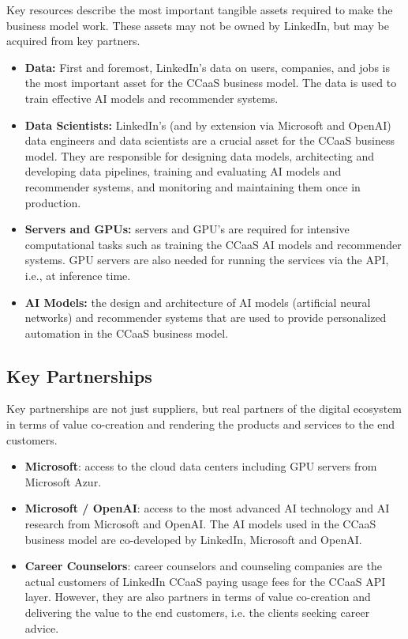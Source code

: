 Key resources describe the most important tangible assets required to make the business model work. These
assets may not be owned by LinkedIn, but may be acquired from key partners.

\begin{itemize}
        \item \textbf{Data:} First and foremost, LinkedIn's data on users, companies, and jobs is the most
                important asset for the CCaaS business model. The data is used to train effective AI models
                and recommender systems.
        \item \textbf{Data Scientists:} LinkedIn's (and by extension via Microsoft and OpenAI) data engineers 
                and data scientists are a crucial asset for the CCaaS business model. They are responsible for
                designing data models, architecting and developing data pipelines, training and evaluating
                AI models and recommender systems, and monitoring and maintaining them once in production.
        \item \textbf{Servers and GPUs:} servers and GPU's are required for intensive computational tasks 
                such as training the CCaaS AI models and recommender systems. GPU servers are also needed 
                for running the services via the API, i.e., at inference time.
        \item \textbf{AI Models:} the design and architecture of AI models (artificial neural networks) and
                recommender systems that are used to provide personalized automation in the CCaaS business model.
\end{itemize}

\subsection{Key Partnerships}

Key partnerships are not just suppliers, but real partners of the digital ecosystem in terms of value
co-creation and rendering the products and services to the end customers.

\begin{itemize}
    \item \textbf{Microsoft}: access to the cloud data centers including GPU servers from Microsoft Azur.
    \item \textbf{Microsoft / OpenAI}: access to the most advanced AI technology and AI research
        from Microsoft and OpenAI. The AI models used in the CCaaS business model are co-developed
        by LinkedIn, Microsoft and OpenAI.
    \item \textbf{Career Counselors}: career counselors and counseling companies are the actual customers
        of LinkedIn CCaaS paying usage fees for the CCaaS API layer. However, they are also partners in
        terms of value co-creation and delivering the value to the end customers, i.e. the clients seeking
        career advice. 
\end{itemize}

